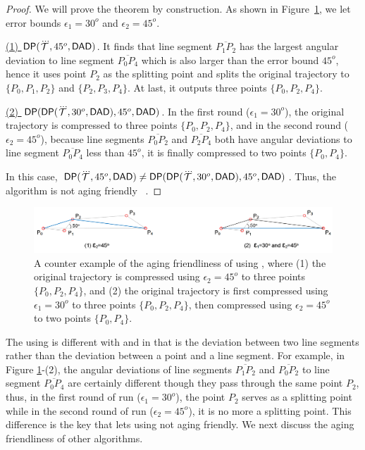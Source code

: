 \begin{proof}
	We will prove the theorem by construction.
	As shown in Figure~\ref{fig:aging-dp-dad}, we let error bounds $\epsilon_1 =30^o$ and $\epsilon_2=45^o$.
	
	\underline{(1) ${{\mathsf{DP}}}(\dddot{\mathcal{T}}, 45^o, {\mathsf{DAD}})$}. It finds that line segment $\overline{P_1P_2}$ has the largest angular deviation to line segment $\overline{P_0P_4}$ which is also larger than the error bound $45^o$, hence it uses point $P_2$ as the splitting point and splits the original trajectory to $\{P_0, P_1, P_2\}$ and $\{P_2, P_3, P_4\}$. At last, it outputs three points $\{P_0, P_2, P_4\}$.
	
	\underline{(2) ${{\mathsf{DP}}}({\mathsf{DP}}(\dddot{\mathcal{T}}, 30^o, {\mathsf{DAD}}), 45^o, {\mathsf{DAD}})$}. In the first round ($\epsilon_1=30^o$), the original trajectory is compressed to three points $\{P_0, P_2, P_4\}$, and in the second round ($\epsilon_2=45^o$), because line segments  $\overline{P_0P_2}$ and $\overline{P_2P_4}$ both have angular deviations to line segment $\overline{P_0P_4}$ less than $45^o$, it is finally compressed to two points $\{P_0, P_4\}$.
	
	In this case, ${{\mathsf{DP}}}(\dddot{\mathcal{T}}, 45^o, {\mathsf{DAD}}) \ne {{\ensuremath {\mathsf{DP}}}}({\mathsf{DP}}(\dddot{\mathcal{T}}, 30^o, {\mathsf{DAD}}), 45^o, {\mathsf{DAD}})$. Thus, the \dpa algorithm is not aging friendly \wrt~\dad.
\end{proof}

\begin{figure}
	\centering
	\includegraphics[scale=0.66]{Figures/Fig-aging-dp.png}
	
	\caption{\small A counter example of the aging friendliness of \dpa using \dad, where (1) the original trajectory is compressed using $\epsilon_2=45^o$ to three points $\{P_0, P_2, P_4\}$, and (2) the original trajectory is first compressed using $\epsilon_1=30^o$ to three points $\{P_0, P_2, P_4\}$, then compressed using $\epsilon_2=45^o$ to two points $\{P_0, P_4\}$. }
	\vspace{-1ex}
	\label{fig:aging-dp-dad}
\end{figure}

The \dpa using \dad is different with \ped and \sed in that \dad is the deviation between two line segments rather than the deviation between a point and a line segment. For example, in Figure \ref{fig:aging-dp-dad}-(2), the angular deviations of line segments $\overline{P_1P_2}$ and $\overline{P_0P_2}$ to line segment $\overline{P_0P_4}$ are certainly different though they pass through the same point $P_2$, thus, in the first round of run ($\epsilon_1=30^o$), the point $P_2$ serves as a splitting point while in the second round of run ($\epsilon_2=45^o$), it is no more a splitting point. This difference is the key that lets \dpa using \dad not aging friendly.
%
We next discuss the aging friendliness of other algorithms.

